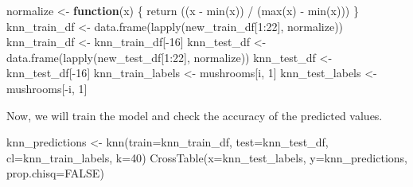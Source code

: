 \documentclass[
]{article}
\newenvironment{Shaded}{\begin{snugshade}}{\end{snugshade}}
\newcommand{\AttributeTok}[1]{\textcolor[rgb]{0.77,0.63,0.00}{#1}}
\newcommand{\ConstantTok}[1]{\textcolor[rgb]{0.00,0.00,0.00}{#1}}
\newcommand{\ControlFlowTok}[1]{\textcolor[rgb]{0.13,0.29,0.53}{\textbf{#1}}}
\newcommand{\DecValTok}[1]{\textcolor[rgb]{0.00,0.00,0.81}{#1}}
\newcommand{\FunctionTok}[1]{\textcolor[rgb]{0.00,0.00,0.00}{#1}}
\newcommand{\NormalTok}[1]{#1}
\newcommand{\OtherTok}[1]{\textcolor[rgb]{0.56,0.35,0.01}{#1}}
\newcommand{\SpecialCharTok}[1]{\textcolor[rgb]{0.00,0.00,0.00}{#1}}
\begin{document}
\begin{Shaded}
\begin{Highlighting}[]
\NormalTok{normalize }\OtherTok{\textless{}{-}} \ControlFlowTok{function}\NormalTok{(x) \{ }\FunctionTok{return}\NormalTok{ ((x }\SpecialCharTok{{-}} \FunctionTok{min}\NormalTok{(x)) }\SpecialCharTok{/}\NormalTok{ (}\FunctionTok{max}\NormalTok{(x) }\SpecialCharTok{{-}} \FunctionTok{min}\NormalTok{(x))) \}}
\NormalTok{knn\_train\_df }\OtherTok{\textless{}{-}} \FunctionTok{data.frame}\NormalTok{(}\FunctionTok{lapply}\NormalTok{(new\_train\_df[}\DecValTok{1}\SpecialCharTok{:}\DecValTok{22}\NormalTok{], normalize))}
\NormalTok{knn\_train\_df }\OtherTok{\textless{}{-}}\NormalTok{ knn\_train\_df[}\SpecialCharTok{{-}}\DecValTok{16}\NormalTok{]}
\NormalTok{knn\_test\_df }\OtherTok{\textless{}{-}} \FunctionTok{data.frame}\NormalTok{(}\FunctionTok{lapply}\NormalTok{(new\_test\_df[}\DecValTok{1}\SpecialCharTok{:}\DecValTok{22}\NormalTok{], normalize))}
\NormalTok{knn\_test\_df }\OtherTok{\textless{}{-}}\NormalTok{ knn\_test\_df[}\SpecialCharTok{{-}}\DecValTok{16}\NormalTok{]}
\NormalTok{knn\_train\_labels }\OtherTok{\textless{}{-}}\NormalTok{ mushrooms[i, }\DecValTok{1}\NormalTok{]}
\NormalTok{knn\_test\_labels }\OtherTok{\textless{}{-}}\NormalTok{ mushrooms[}\SpecialCharTok{{-}}\NormalTok{i, }\DecValTok{1}\NormalTok{]}
\end{Highlighting}
\end{Shaded}

Now, we will train the model and check the accuracy of the predicted
values.

\begin{Shaded}
\begin{Highlighting}[]
\NormalTok{knn\_predictions }\OtherTok{\textless{}{-}} \FunctionTok{knn}\NormalTok{(}\AttributeTok{train=}\NormalTok{knn\_train\_df, }\AttributeTok{test=}\NormalTok{knn\_test\_df, }\AttributeTok{cl=}\NormalTok{knn\_train\_labels, }\AttributeTok{k=}\DecValTok{40}\NormalTok{)}
\FunctionTok{CrossTable}\NormalTok{(}\AttributeTok{x=}\NormalTok{knn\_test\_labels, }\AttributeTok{y=}\NormalTok{knn\_predictions, }\AttributeTok{prop.chisq=}\ConstantTok{FALSE}\NormalTok{)}
\end{Highlighting}
\end{Shaded}
\end{document}
